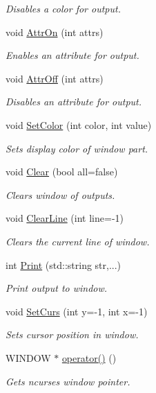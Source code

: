 \begin{DoxyCompactItemize}
\begin{DoxyCompactList}\small\item\em Disables a color for output. \end{DoxyCompactList}\item 
void \hyperlink{classostendo_1_1Window_ab91a9f66a8f05e9349905ec9b1623de4}{Attr\+On} (int attrs)
\begin{DoxyCompactList}\small\item\em Enables an attribute for output. \end{DoxyCompactList}\item 
void \hyperlink{classostendo_1_1Window_aa2e4c33da0d446f52e7c34d1ec781bbc}{Attr\+Off} (int attrs)
\begin{DoxyCompactList}\small\item\em Disables an attribute for output. \end{DoxyCompactList}\item 
void \hyperlink{classostendo_1_1Window_adde21c9878a3d8dd0d94ae68d58040cb}{Set\+Color} (int color, int value)
\begin{DoxyCompactList}\small\item\em Sets display color of window part. \end{DoxyCompactList}\item 
void \hyperlink{classostendo_1_1Window_ae4c005e63e6b15c5e9b940025a80b90d}{Clear} (bool all=false)
\begin{DoxyCompactList}\small\item\em Clears window of outputs. \end{DoxyCompactList}\item 
void \hyperlink{classostendo_1_1Window_abaa3685e5937a29aabd7acf078b789c1}{Clear\+Line} (int line=-\/1)
\begin{DoxyCompactList}\small\item\em Clears the current line of window. \end{DoxyCompactList}\item 
int \hyperlink{classostendo_1_1Window_a1781807aea1eb5dedc9f2885e41fcd2b}{Print} (std\+::string str,...)
\begin{DoxyCompactList}\small\item\em Print output to window. \end{DoxyCompactList}\item 
void \hyperlink{classostendo_1_1Window_a4e6839482997c00795f3c4191d80b3c4}{Set\+Curs} (int y=-\/1, int x=-\/1)
\begin{DoxyCompactList}\small\item\em Sets cursor position in window. \end{DoxyCompactList}\item 
W\+I\+N\+D\+OW $\ast$ \hyperlink{classostendo_1_1Window_a4a67da930b3dda1951fef1d506d83980}{operator()} ()
\begin{DoxyCompactList}\small\item\em Gets ncurses window pointer. \end{DoxyCompactList}\end{DoxyCompactItemize}
